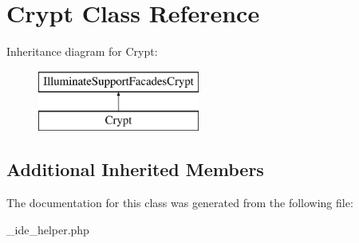 \hypertarget{class_crypt}{}\section{Crypt Class Reference}
\label{class_crypt}
Inheritance diagram for Crypt\+:\begin{figure}[H]
\begin{center}
\leavevmode
\includegraphics[height=2.000000cm]{class_crypt}
\end{center}
\end{figure}
\subsection*{Additional Inherited Members}


The documentation for this class was generated from the following file\+:\begin{DoxyCompactItemize}
\item 
\+\_\+ide\+\_\+helper.\+php\end{DoxyCompactItemize}

